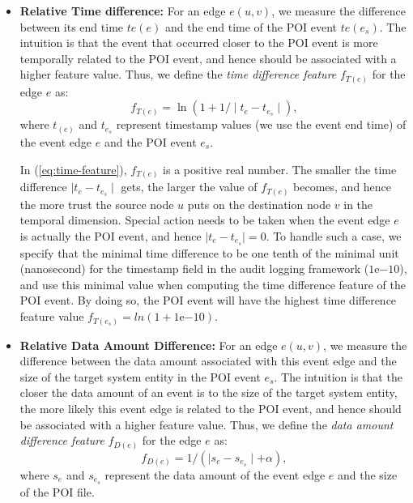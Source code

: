\begin{itemize}[noitemsep, topsep=1pt, partopsep=1pt, listparindent=\parindent, leftmargin=*]

\item \textbf{Relative Time difference:}
For an edge $e(u,v)$, we measure the difference between its end time $te(e)$ and the end time of the POI event $te(e_s)$.
The intuition is that the event that occurred closer to the POI event is more temporally related to the POI event, and hence should be associated with a higher feature value. 
Thus, we define the \emph{time difference feature} $f_{T(e)}$ for the edge $e$ as:
\begin{equation}
\label{eq:time-feature}
    f_{T(e)} = \ln(1 + 1/\mid t_{e} - t_{e_s}\mid),
\end{equation}
where $t_{(e)}$ and $t_{e_s}$ represent timestamp values (we use the event end time) 
of the event edge $e$ and the POI event $e_s$.

In (\ref{eq:time-feature}), $f_{T(e)}$ is a positive real number. The smaller the time difference $\mid t_e - t_{e_s}\mid$ gets, the larger the value of $f_{T(e)}$ becomes, and hence the more trust the source node $u$ puts on the destination node $v$ in the temporal dimension.
Special action needs to be taken when the event edge $e$ is actually the POI event, and hence $\mid t_{e} - t_{e_s}\mid = 0$. To handle such a case, we specify that the minimal time difference to be one tenth of the minimal unit (\ie nanosecond) for the timestamp field in the audit logging framework (\ie $1\mathrm{e}{-10}$), and use this minimal value when computing the time difference feature of the POI event. By doing so, the POI event will have the highest time difference feature value $f_{T(e_s)} = ln(1 + 1\mathrm{e}{-10})$.

\item \textbf{Relative Data Amount Difference:}
For an edge $e(u, v)$, we measure the difference between the data amount associated with this event edge and the size of the target system entity in the POI event $e_s$.
The intuition is that the closer the data amount of an event is to the size of the target system entity, the more likely this event edge is related to the POI event, and hence should be associated with a higher feature value. Thus, we define the \emph{data amount difference feature} $f_{D(e)}$ for the edge $e$ as:
\begin{equation}
\label{eq:data-feature}
    f_{D(e)} = 1/(\mid s_{e} - s_{e_s}\mid + \alpha),
\end{equation}
where $s_{e}$ and $s_{e_s}$ represent the data amount of the event edge $e$ and the size of the POI file.


\end{itemize}
